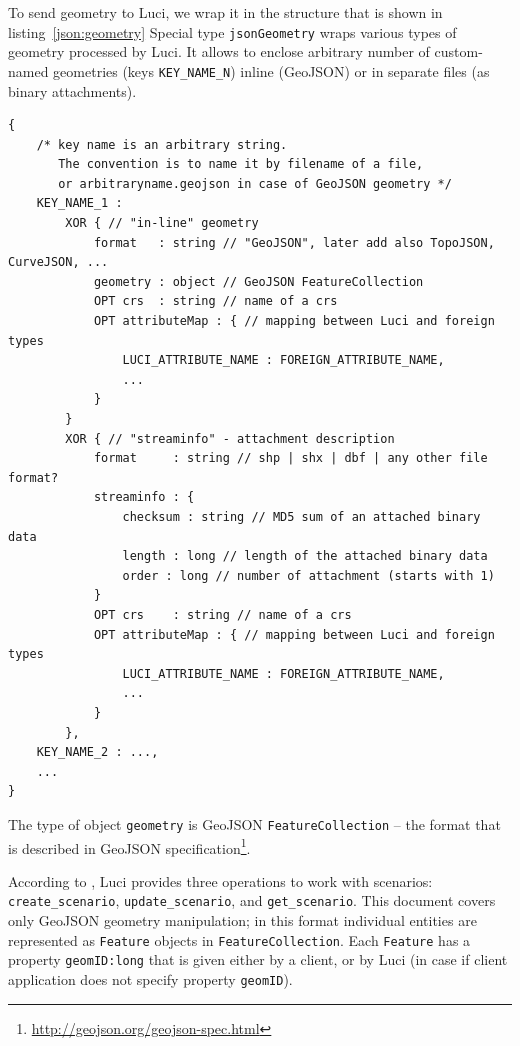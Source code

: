 To send geometry to \ac{Luci}, we wrap it in the structure that is shown in listing~\ref{json:geometry}
Special type \texttt{\color{blue}jsonGeometry} wraps various types of geometry processed by \ac{Luci}.
It allows to enclose arbitrary number of custom-named geometries (keys \texttt{KEY\_NAME\_N}) inline (GeoJSON) or in separate files (as binary attachments).
%
\begin{lstlisting}[caption={structure of \texttt{\color{blue}jsonGeometry} data type}, label={json:geometry}]
{
	/* key name is an arbitrary string.
	   The convention is to name it by filename of a file,
	   or arbitraryname.geojson in case of GeoJSON geometry */
	KEY_NAME_1 :
		XOR { // "in-line" geometry
			format   : string // "GeoJSON", later add also TopoJSON, CurveJSON, ...
			geometry : object // GeoJSON FeatureCollection
			OPT crs  : string // name of a crs
			OPT attributeMap : { // mapping between Luci and foreign types
				LUCI_ATTRIBUTE_NAME : FOREIGN_ATTRIBUTE_NAME,
				...
			}
		}
		XOR { // "streaminfo" - attachment description
			format     : string // shp | shx | dbf | any other file format?
			streaminfo : {
				checksum : string // MD5 sum of an attached binary data
				length : long // length of the attached binary data
				order : long // number of attachment (starts with 1)
			}
			OPT crs    : string // name of a crs
			OPT attributeMap : { // mapping between Luci and foreign types
				LUCI_ATTRIBUTE_NAME : FOREIGN_ATTRIBUTE_NAME,
				...
			}
		},
	KEY_NAME_2 : ...,
	...
}
\end{lstlisting}
%
The type of object \texttt{geometry} is GeoJSON \texttt{FeatureCollection} -- the format that is described in GeoJSON specification\footnote{\url{http://geojson.org/geojson-spec.html}}.



According to ,
\ac{Luci} provides three operations to work with scenarios:
\texttt{create\_scenario}, \texttt{update\_scenario}, and \texttt{get\_scenario}.
This document covers only GeoJSON geometry manipulation;
in this format individual entities are represented as \texttt{Feature} objects in \texttt{FeatureCollection}.
Each \texttt{Feature} has a property \texttt{geomID:\color{blue}long} that is given either by a client, or by \ac{Luci} (in case if client application does not specify property \texttt{geomID}).


